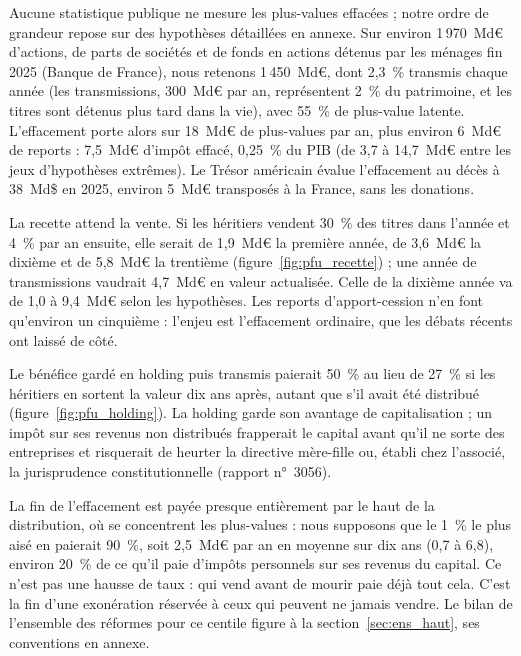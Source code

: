 Aucune statistique publique ne mesure les plus-values effacées ; notre ordre de grandeur repose sur des hypothèses
détaillées en annexe. Sur environ 1\,970~Md€ d'actions, de parts de sociétés et de fonds en actions détenus par les
ménages fin 2025 (Banque de France), nous retenons 1\,450~Md€, dont 2,3~\% transmis chaque année (les transmissions,
300~Md€ par an, représentent 2~\% du patrimoine, et les titres sont détenus plus tard dans la vie), avec 55~\% de
plus-value latente. L'effacement porte alors sur 18~Md€ de plus-values par an, plus environ 6~Md€ de reports :
7,5~Md€ d'impôt effacé, 0,25~\% du PIB (de 3,7 à 14,7~Md€ entre les jeux d'hypothèses extrêmes). Le Trésor américain
évalue l'effacement au décès à 38~Md\$ en 2025, environ 5~Md€ transposés à la France, sans les donations.

La recette attend la vente. Si les héritiers vendent 30~\% des titres dans l'année et 4~\% par an ensuite, elle
serait de 1,9~Md€ la première année, de 3,6~Md€ la dixième et de 5,8~Md€ la trentième
(figure~\ref{fig:pfu_recette}) ; une année de transmissions vaudrait 4,7~Md€ en valeur actualisée. Celle de la dixième
année va de 1,0 à 9,4~Md€ selon les hypothèses. Les reports d'apport-cession n'en font qu'environ un
cinquième : l'enjeu est l'effacement ordinaire, que les débats récents ont laissé de côté.


Le bénéfice gardé en holding puis transmis paierait 50~\% au lieu de 27~\% si les héritiers en sortent la valeur
dix ans après, autant que s'il avait été distribué (figure~\ref{fig:pfu_holding}). La holding garde son avantage de
capitalisation ; un impôt sur ses revenus non distribués frapperait le capital avant qu'il ne sorte des
entreprises et risquerait de heurter la directive mère-fille ou, établi chez l'associé, la jurisprudence
constitutionnelle (rapport n°~3056).


La fin de l'effacement est payée presque entièrement par le haut de la distribution, où se concentrent les
plus-values : nous supposons que le 1~\% le plus aisé en paierait 90~\%, soit 2,5~Md€ par an en moyenne sur dix ans
(0,7 à 6,8), environ 20~\% de ce qu'il paie d'impôts personnels sur ses revenus du capital. Ce n'est pas une hausse
de taux : qui vend avant de mourir paie déjà tout cela. C'est la fin d'une exonération réservée à ceux qui peuvent ne
jamais vendre. Le bilan de l'ensemble des réformes pour ce centile figure à la section~\ref{sec:ens_haut}, ses
conventions en annexe.


